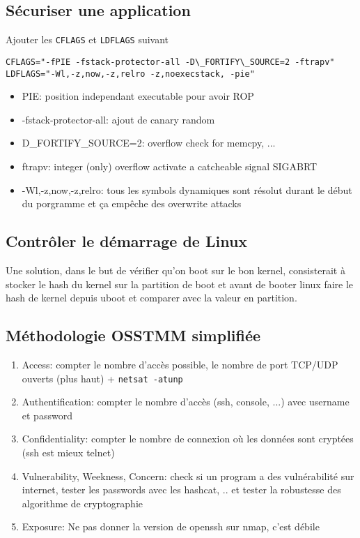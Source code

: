 \subsection{Sécuriser une application}
Ajouter les \verb!CFLAGS! et \verb!LDFLAGS! suivant
\begin{lstlisting}[style=bash]
CFLAGS="-fPIE -fstack-protector-all -D\_FORTIFY\_SOURCE=2 -ftrapv"
LDFLAGS="-Wl,-z,now,-z,relro -z,noexecstack, -pie"
\end{lstlisting}
\begin{itemize}
\item PIE: position independant executable pour avoir ROP
\item -fstack-protector-all: ajout de canary random
\item D\_FORTIFY\_SOURCE=2: overflow check for memcpy, ...
\item ftrapv: integer (only) overflow activate a catcheable signal SIGABRT
\item -Wl,-z,now,-z,relro: tous les symbols dynamiques sont résolut durant le début du porgramme et ça empêche des overwrite attacks
\end{itemize}

\subsection{Contrôler le démarrage de Linux}
Une solution, dans le but de vérifier qu'on boot sur le bon kernel, consisterait à stocker le hash du kernel sur la partition de boot et avant de booter linux faire le hash de kernel depuis uboot et comparer avec la valeur en partition. 
\subsection{Méthodologie OSSTMM simplifiée}
\begin{enumerate}
\item Access: compter le nombre d'accès possible, le nombre de port TCP/UDP ouverts (plus haut) + \verb!netsat -atunp!
\item Authentification: compter le nombre d'accès (ssh, console, ...) avec username et password
\item Confidentiality: compter le nombre de connexion où les données sont cryptées (ssh est mieux telnet)
\item Vulnerability, Weekness, Concern: check si un program a des vulnérabilité sur internet, tester les passwords avec les hashcat, .. et tester la robustesse des algorithme de cryptographie
\item Exposure: Ne pas donner la version de openssh sur nmap, c'est débile
\end{enumerate}
